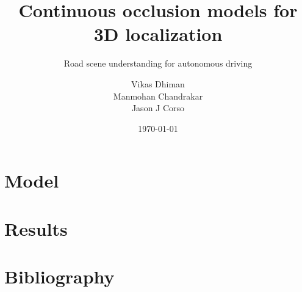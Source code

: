 



\title{Continuous occlusion models for 3D localization}
\subtitle{Road scene understanding for autonomous driving}
\date{\today}
\author{Vikas Dhiman\\ Manmohan Chandrakar\\ Jason J Corso}

%



\maketitle





\section{Model}



\section{Results}


\section{Bibliography}
\begin{frame}


\end{frame}


